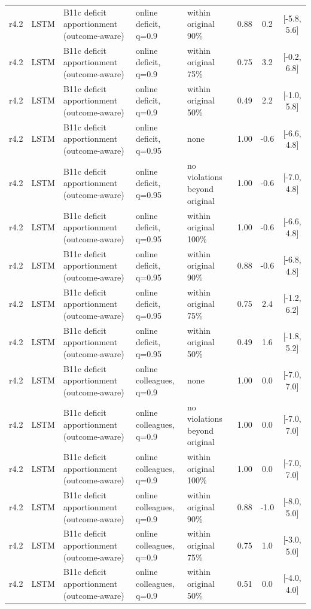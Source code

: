 \documentclass[10pt,onecolumn,letterpaper]{article}
\begin{document}
\begin{longtable}{lllp{4.2cm}p{3.4cm}ccc}
r4.2 & LSTM & B11c deficit apportionment (outcome-aware) & online deficit, q=0.9 & within original 90\% & 0.88 & 0.2 & [-5.8, 5.6] \\
r4.2 & LSTM & B11c deficit apportionment (outcome-aware) & online deficit, q=0.9 & within original 75\% & 0.75 & 3.2 & [-0.2, 6.8] \\
r4.2 & LSTM & B11c deficit apportionment (outcome-aware) & online deficit, q=0.9 & within original 50\% & 0.49 & 2.2 & [-1.0, 5.8] \\
r4.2 & LSTM & B11c deficit apportionment (outcome-aware) & online deficit, q=0.95 & none & 1.00 & -0.6 & [-6.6, 4.8] \\
r4.2 & LSTM & B11c deficit apportionment (outcome-aware) & online deficit, q=0.95 & no violations beyond original & 1.00 & -0.6 & [-7.0, 4.8] \\
r4.2 & LSTM & B11c deficit apportionment (outcome-aware) & online deficit, q=0.95 & within original 100\% & 1.00 & -0.6 & [-6.6, 4.8] \\
r4.2 & LSTM & B11c deficit apportionment (outcome-aware) & online deficit, q=0.95 & within original 90\% & 0.88 & -0.6 & [-6.8, 4.8] \\
r4.2 & LSTM & B11c deficit apportionment (outcome-aware) & online deficit, q=0.95 & within original 75\% & 0.75 & 2.4 & [-1.2, 6.2] \\
r4.2 & LSTM & B11c deficit apportionment (outcome-aware) & online deficit, q=0.95 & within original 50\% & 0.49 & 1.6 & [-1.8, 5.2] \\
r4.2 & LSTM & B11c deficit apportionment (outcome-aware) & online colleagues, q=0.9 & none & 1.00 & 0.0 & [-7.0, 7.0] \\
r4.2 & LSTM & B11c deficit apportionment (outcome-aware) & online colleagues, q=0.9 & no violations beyond original & 1.00 & 0.0 & [-7.0, 7.0] \\
r4.2 & LSTM & B11c deficit apportionment (outcome-aware) & online colleagues, q=0.9 & within original 100\% & 1.00 & 0.0 & [-7.0, 7.0] \\
r4.2 & LSTM & B11c deficit apportionment (outcome-aware) & online colleagues, q=0.9 & within original 90\% & 0.88 & -1.0 & [-8.0, 5.0] \\
r4.2 & LSTM & B11c deficit apportionment (outcome-aware) & online colleagues, q=0.9 & within original 75\% & 0.75 & 1.0 & [-3.0, 5.0] \\
r4.2 & LSTM & B11c deficit apportionment (outcome-aware) & online colleagues, q=0.9 & within original 50\% & 0.51 & 0.0 & [-4.0, 4.0] \\

\end{longtable}
\end{document}
